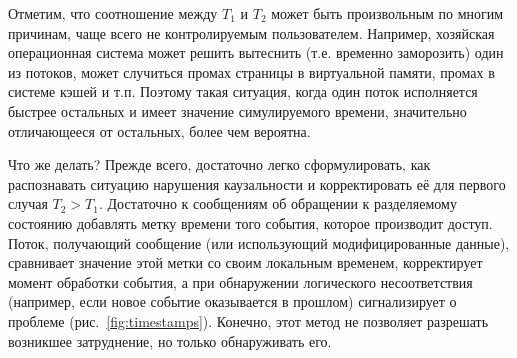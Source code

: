 Отметим, что соотношение между $T_1$ и $T_2$ может быть произвольным по многим причинам, чаще всего не контролируемым пользователем. Например, хозяйская операционная система может решить вытеснить (т.е. временно заморозить) один из потоков, может случиться промах страницы в виртуальной памяти, промах в системе кэшей и т.п. Поэтому такая ситуация, когда один поток исполняется быстрее остальных и имеет значение симулируемого времени, значительно отличающееся от остальных, более чем вероятна.


Что же делать? Прежде всего, достаточно легко сформулировать, как распознавать ситуацию нарушения каузальности и корректировать её для первого случая $T_2 > T_1$. Достаточно к сообщениям об обращении к разделяемому состоянию добавлять метку времени того события, которое производит доступ. Поток, получающий сообщение (или использующий модифицированные  данные), сравнивает значение этой метки со своим локальным временем, корректирует момент обработки события, а при обнаружении логического несоответствия (например, если новое событие оказывается в прошлом) сигнализирует о проблеме (рис.~\ref{fig:timestamps}). Конечно, этот метод не позволяет разрешать возникшее затруднение, но только обнаруживать его. 

